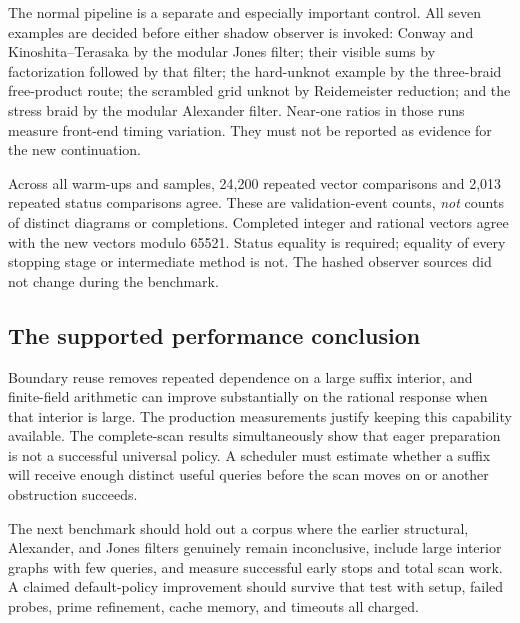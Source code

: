 The normal pipeline is a separate and especially important control. All seven
examples are decided before either shadow observer is invoked: Conway and
Kinoshita--Terasaka by the modular Jones filter; their visible sums by
factorization followed by that filter; the hard-unknot example by the
three-braid free-product route; the scrambled grid unknot by Reidemeister
reduction; and the stress braid by the modular Alexander filter. Near-one
ratios in those runs measure front-end timing variation. They must not be
reported as evidence for the new continuation.

Across all warm-ups and samples, 24,200 repeated vector comparisons and 2,013
repeated status comparisons agree. These are validation-event counts,
\emph{not} counts of distinct diagrams or completions. Completed integer and
rational vectors agree with the new vectors modulo 65521. Status equality is
required; equality of every stopping stage or intermediate method is not.
The hashed observer sources did not change during the benchmark.

\subsection{The supported performance conclusion}

Boundary reuse removes repeated dependence on a large suffix interior, and
finite-field arithmetic can improve substantially on the rational response
when that interior is large. The production measurements justify keeping this
capability available. The complete-scan results simultaneously show that eager
preparation is not a successful universal policy. A scheduler must estimate
whether a suffix will receive enough distinct useful queries before the scan
moves on or another obstruction succeeds.

The next benchmark should hold out a corpus where the earlier structural,
Alexander, and Jones filters genuinely remain inconclusive, include large
interior graphs with few queries, and measure successful early stops and total
scan work. A claimed default-policy improvement should survive that test with
setup, failed probes, prime refinement, cache memory, and timeouts all charged.
